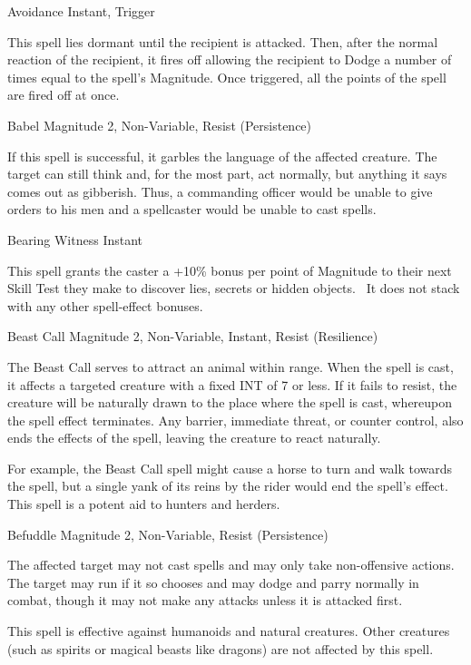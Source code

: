 \begin{rpg-spell}
{Avoidance}
{Instant, Trigger}

This spell lies dormant until the recipient is attacked. Then, after the normal reaction of the recipient, it fires off allowing the recipient to Dodge a number of times equal to the spell’s Magnitude. Once triggered, all the points of the spell are fired off at once.
\end{rpg-spell}


\begin{rpg-spell}
{Babel}
{Magnitude 2, Non-Variable, Resist (Persistence)}

If this spell is successful, it garbles the language of the affected creature. The target can still think and, for the most part, act normally, but anything it says comes out as gibberish. Thus, a commanding officer would be unable to give orders to his men and a spellcaster would be unable to cast spells.
\end{rpg-spell}


\begin{rpg-spell}
{Bearing Witness}
{Instant}

This spell grants the caster a +10\% bonus per point of Magnitude to their next Skill Test they make to discover lies, secrets or hidden objects.  It does not stack with any other spell-effect bonuses.
\end{rpg-spell}


\begin{rpg-spell}
{Beast Call}
{Magnitude 2, Non-Variable, Instant, Resist (Resilience)}

The Beast Call serves to attract an animal within range. When the spell is cast, it affects a targeted creature with a fixed INT of 7 or less. If it fails to resist, the creature will be naturally drawn to the place where the spell is cast, whereupon the spell effect terminates. Any barrier, immediate threat, or counter control, also ends the effects of the spell, leaving the creature to react naturally. 

For example, the Beast Call spell might cause a horse to turn and walk towards the spell, but a single yank of its reins by the rider would end the spell’s effect. This spell is a potent aid to hunters and herders.
\end{rpg-spell}


\begin{rpg-spell}
{Befuddle}
{Magnitude 2, Non-Variable, Resist (Persistence)}

The affected target may not cast spells and may only take non-offensive actions. The target may run if it so chooses and may dodge and parry normally in combat, though it may not make any attacks unless it is attacked first. 

This spell is effective against humanoids and natural creatures. Other creatures (such as spirits or magical beasts like dragons) are not affected by this spell. 
\end{rpg-spell}



